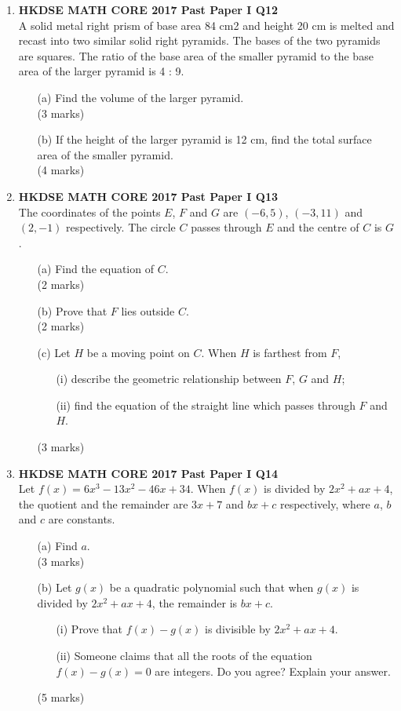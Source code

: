 \documentclass[12pt]{article}
\begin{document}
\begin{enumerate}
	\item \textbf{HKDSE MATH CORE 2017 Past Paper I Q12}\\
	A solid metal right prism of base area 84 cm2 and height 20 cm is melted and recast into two similar solid right pyramids. The bases of the two pyramids are squares. The ratio of the base area of the smaller pyramid to the base area of the larger pyramid is 4 : 9.
	\begin{enumerate}
		\item[(a)] Find the volume of the larger pyramid. \\(3 marks)
		\item[(b)] If the height of the larger pyramid is 12 cm, find the total surface area of the smaller pyramid. \\(4 marks)
	\end{enumerate}

	\item \textbf{HKDSE MATH CORE 2017 Past Paper I Q13}\\
	The coordinates of the points $E$, $F$ and $G$ are $(-6, 5)$, $(-3, 11)$ and $(2, -1)$ respectively. The circle $C$ passes through $E$ and the centre of $C$ is $G$.
	\begin{enumerate}
		\item[(a)] Find the equation of $C$. \\(2 marks)
		\item[(b)] Prove that $F$ lies outside $C$. \\(2 marks)
		\item[(c)] Let $H$ be a moving point on $C$. When $H$ is farthest from $F$,
		\begin{enumerate}
			\item[(i)] describe the geometric relationship between $F$, $G$ and $H$;
			\item[(ii)] find the equation of the straight line which passes through $F$ and $H$.
		\end{enumerate}
		(3 marks)
	\end{enumerate}

	\item \textbf{HKDSE MATH CORE 2017 Past Paper I Q14}\\
	Let $f(x) = 6x^3 - 13x^2 - 46x + 34$. When $f(x)$ is divided by $2x^2 + ax + 4$, the quotient and the remainder are $3x + 7$ and $bx + c$ respectively, where $a$, $b$ and $c$ are constants.
	\begin{enumerate}
		\item[(a)] Find $a$. \\(3 marks)
		\item[(b)] Let $g(x)$ be a quadratic polynomial such that when $g(x)$ is divided by $2x^2 + ax + 4$, the remainder is $bx + c$.
		\begin{enumerate}
			\item[(i)] Prove that  $f(x) - g(x)$ is divisible by $2x^2 + ax + 4$.
			\item[(ii)] Someone claims that all the roots of the equation  $f(x) - g(x) = 0$ are integers. Do you agree? Explain your answer.
		\end{enumerate}
		(5 marks)
	\end{enumerate}


\end{enumerate}
\end{document}
